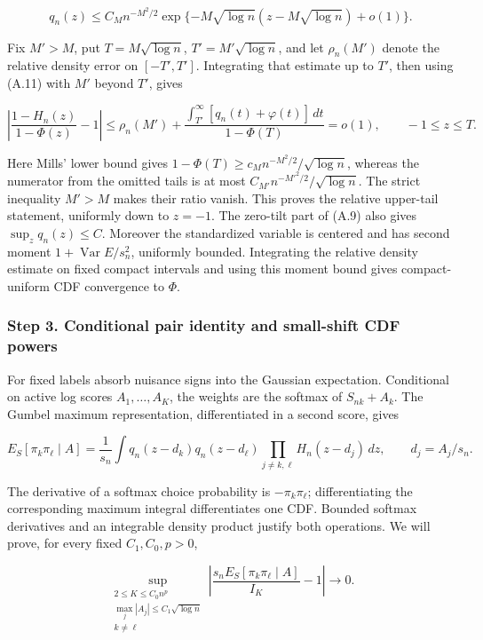 \documentclass{article}
\begin{document}
\[
q_n(z)\le C_Mn^{-M^2/2}
\exp\{-M\sqrt{\log n}(z-M\sqrt{\log n})+o(1)\}.
\tag{A.11}
\]

Fix \(M'>M\), put \(T=M\sqrt{\log n}\), \(T'=M'\sqrt{\log n}\), and let
\(\rho_n(M')\) denote the relative density error on \([-T',T']\).
Integrating that estimate up to \(T'\), then using (A.11) with \(M'\)
beyond \(T'\), gives

\[
\left|\frac{1-H_n(z)}{1-\Phi(z)}-1\right|
\le \rho_n(M')+
\frac{\int_{T'}^\infty[q_n(t)+\varphi(t)]\,dt}{1-\Phi(T)}
=o(1),\qquad -1\le z\le T.
\]

Here Mills' lower bound gives
\(1-\Phi(T)\ge c_M n^{-M^2/2}/\sqrt{\log n}\), whereas the numerator
from the omitted tails is at most \(C_{M'} n^{-M'^2/2}/\sqrt{\log n}\).
The strict inequality \(M'>M\) makes their ratio vanish. This proves the
relative upper-tail statement, uniformly down to \(z=-1\). The zero-tilt
part of (A.9) also gives \(\sup_zq_n(z)\le C\). Moreover the
standardized variable is centered and has second moment
\(1+\operatorname{Var}E/s_n^2\), uniformly bounded. Integrating the
relative density estimate on fixed compact intervals and using this
moment bound gives compact-uniform CDF convergence to \(\Phi\).

\subsubsection*{Step 3. Conditional pair identity and small-shift CDF
powers}\label{step-3.-conditional-pair-identity-and-small-shift-cdf-powers}

For fixed labels absorb nuisance signs into the Gaussian expectation.
Conditional on active log scores \(A_1,\ldots,A_K\), the weights are the
softmax of \(S_{nk}+A_k\). The Gumbel maximum representation,
differentiated in a second score, gives

\[
E_S[\pi_k\pi_\ell\mid A]
=\frac1{s_n}\int q_n(z-d_k)q_n(z-d_\ell)
\prod_{j\ne k,\ell}H_n(z-d_j)\,dz,\qquad d_j=A_j/s_n .
\tag{A.12}
\]

The derivative of a softmax choice probability is \(-\pi_k\pi_\ell\);
differentiating the corresponding maximum integral differentiates one
CDF. Bounded softmax derivatives and an integrable density product
justify both operations. We will prove, for every fixed \(C_1,C_0,p>0\),

\[
\sup_{\substack{2\le K\le C_0n^p\\
\max_j|A_j|\le C_1\sqrt{\log n}\\k\ne\ell}}
\left|\frac{s_nE_S[\pi_k\pi_\ell\mid A]}{I_K}-1\right|\longrightarrow0 .
\tag{A.13}
\]
\end{document}
